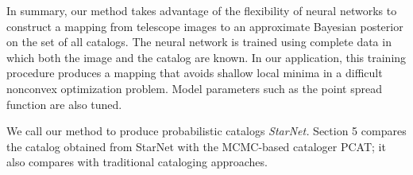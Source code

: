 In summary, our method takes advantage of the flexibility of neural networks to construct a mapping from telescope images to an approximate Bayesian posterior on the set of all catalogs. 
The neural network is trained using complete data 
in which both the image and the catalog are known. 
In our application, this training procedure produces a mapping that avoids shallow local minima in a difficult nonconvex optimization problem. 
Model parameters such as the point spread function are also tuned. 

We call our method to produce probabilistic catalogs {\itshape StarNet.}
Section 5 compares the catalog obtained from StarNet with the MCMC-based cataloger PCAT;
it also compares with traditional cataloging approaches.




















